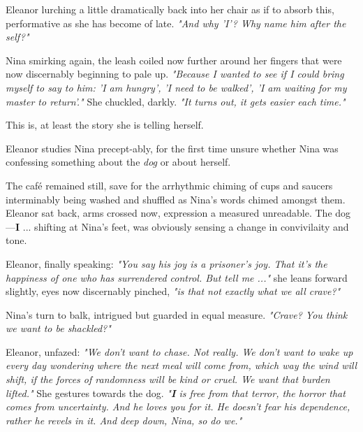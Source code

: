 Eleanor lurching a little dramatically back into her chair as if to absorb this, performative as she has become of late. \textit{"And why 'I'? Why name him after the self?"}

\smallskip

Nina smirking again, the leash coiled now further around her fingers that were now discernably beginning to pale up. \textit{"Because I wanted to see if I could bring myself to say to him: 'I am hungry', 'I need to be walked', 'I am waiting for my master to return'."} She chuckled, darkly. \textit{"It turns out, it gets easier each time."} 

\smallskip

This is, at least the story she is telling herself.

\smallskip

Eleanor studies Nina precept-ably, for the first time unsure whether Nina was confessing something about the \textit{dog} or about herself.

\smallskip

The café remained still, save for the arrhythmic chiming of cups and saucers interminably being washed and shuffled as Nina's words chimed amongst them.  Eleanor sat back, arms crossed now, expression a measured unreadable. The dog—\textbf{I} ... shifting at Nina’s feet, was obviously sensing a change in convivilaity and tone.  

\smallskip

Eleanor, finally speaking: \textit{"You say his joy is a prisoner’s joy. That it’s the happiness of one who has surrendered control. But tell me ..."} she leans forward slightly, eyes now discernably pinched, \textit{"is that not exactly what we all crave?"}

\smallskip

Nina's turn to balk, intrigued but guarded in equal measure. \textit{"Crave? You think we want to be shackled?"}

\smallskip

Eleanor, unfazed: \textit{"We don’t want to chase. Not really. We don’t want to wake up every day wondering where the next meal will come from, which way the wind will shift, if the forces of randomness will be kind or cruel. We want that burden lifted."} She gestures towards the dog. \textit{"\textbf{I} is free from that terror, the horror that comes from uncertainty. And he loves you for it. He doesn’t fear his dependence, rather he revels in it. And deep down, Nina, so do we."}

\smallskip

